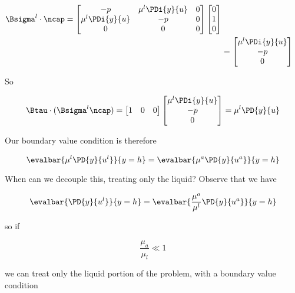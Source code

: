 \begin{align*}
\Bsigma^l \cdot \ncap = 
\begin{bmatrix}
-p & \mu^l \PDi{y}{u} & 0 \\
\mu^l \PDi{y}{u} & -p & 0 \\
0 & 0 & 0
\end{bmatrix}
\begin{bmatrix}
0 \\
1 \\
0
\end{bmatrix} \\
&=
\begin{bmatrix}
\mu^l \PDi{y}{u} \\
-p \\
0
\end{bmatrix}
\end{align*}

So

\begin{equation}\label{eqn:continuumL12:230}
\Btau \cdot (\Bsigma^l \ncap)
=
\begin{bmatrix}
1 & 0 & 0
\end{bmatrix}
\begin{bmatrix}
\mu^l \PDi{y}{u} \\
-p \\
0
\end{bmatrix}
=
\mu^l \PD{y}{u}
\end{equation}

Our boundary value condition is therefore

\begin{equation}\label{eqn:continuumL12:250}
\evalbar{\mu^l \PD{y}{u^l}}{y = h} =
\evalbar{\mu^a \PD{y}{u^a}}{y = h}
\end{equation}

When can we decouple this, treating only the liquid?  Observe that we have

\begin{equation}\label{eqn:continuumL12:270}
\evalbar{\PD{y}{u^l}}{y = h} =
\evalbar{\frac{\mu^a}{\mu^l} \PD{y}{u^a}}{y = h}
\end{equation}

so if

\begin{equation}\label{eqn:continuumL12:290}
\frac{\mu_a}{\mu_l} \ll 1
\end{equation}

we can treat only the liquid portion of the problem, with a boundary value condition

